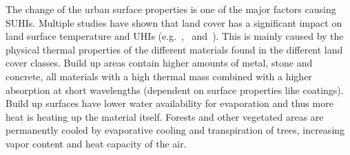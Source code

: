 \documentclass[12pt,a4paper, english,twoside]{scrartcl}
\begin{document}
      The change of the urban surface properties is one of the major factors causing \glspl{SUHI}.  
      Multiple studies have shown that land cover has a significant impact on land surface temperature and \glspl{UHI} (e.g.~\cite{Karakus2019},~\cite{Weng2004} and~\cite{Stewart2011}). 
      This is mainly caused by the physical thermal properties of the different materials found in the different land cover classes. 
      Build up areas contain higher amounts of metal, stone and concrete, all materials with a high thermal mass combined with a higher absorption at short wavelengths (dependent on surface properties like coatings).  
      Build up surfaces have lower water availability for evaporation and thus more heat is heating up the material itself.
      Forests and other vegetated areas are permanently cooled by evaporative cooling and transpiration of trees, increasing vapor content and heat capacity of the air.
\end{document}
